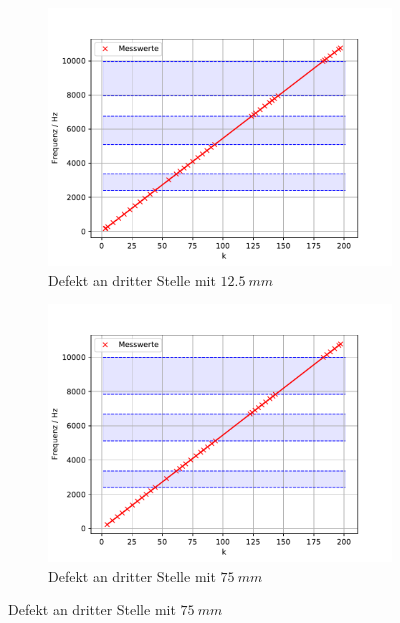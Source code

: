   \begin{figure}
   \centering
   \begin{subfigure}{0.48\textwidth}
    \centering
    \includegraphics[width=1.1\textwidth]{max.pdf}
    \caption{Defekt an dritter Stelle mit $\SI{12.5}{mm}$}
    \label{fig.Aufgabe121}
   \end{subfigure}
   \begin{subfigure}{0.48\textwidth}
    \centering
    \includegraphics[width=1.1\textwidth]{max2.pdf}
    \caption{Defekt an dritter Stelle mit $\SI{75}{mm}$}
    \label{fig.Aufgabe122}
   \end{subfigure}


\end{figure}
